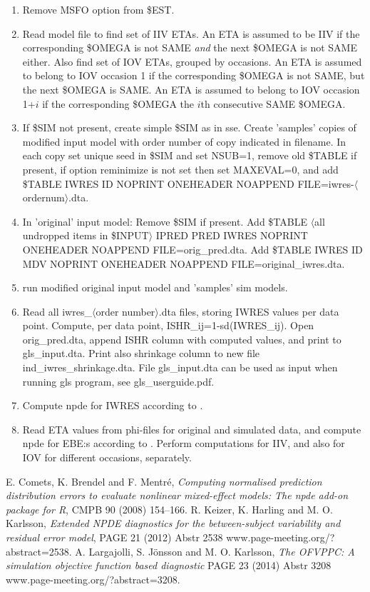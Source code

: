 \begin{enumerate}
\item Remove MSFO option from \$EST.
\item Read model file to find set of IIV ETAs. An ETA is assumed to be IIV if the corresponding \$OMEGA is not SAME
\emph{and} the next \$OMEGA is not SAME either. Also find set of IOV ETAs, grouped by occasions.
An ETA is assumed to belong to IOV occasion 1 if the corresponding \$OMEGA is not SAME, but the next \$OMEGA is SAME. 
An ETA is assumed to belong to IOV occasion 1+$i$ if the corresponding \$OMEGA the $i$th consecutive SAME \$OMEGA. 
\item If \$SIM not present, create simple \$SIM as in sse. Create 'samples' copies of modified input model with order number of copy indicated in filename. In each copy set unique seed in \$SIM and set NSUB=1, remove old \$TABLE if present, 
if option reminimize is not set then set MAXEVAL=0, and add \$TABLE IWRES ID NOPRINT ONEHEADER NOAPPEND FILE=iwres-$\langle$ordernum$\rangle$.dta. 
\item In 'original' input model: Remove \$SIM if present. Add \$TABLE $\langle$all undropped items in \$INPUT$\rangle$ IPRED PRED IWRES NOPRINT ONEHEADER NOAPPEND FILE=orig\_pred.dta. Add \$TABLE IWRES ID MDV NOPRINT ONEHEADER NOAPPEND FILE=original\_iwres.dta. 
\item run modified original input model and 'samples' sim models.
\item Read all iwres\_$\langle$order number$\rangle$.dta files, storing IWRES values per data point. Compute, per data point, ISHR\_ij=1-sd(IWRES\_ij). Open orig\_pred.dta, append ISHR column with computed values, and print to gls\_input.dta. Print also shrinkage column to new file ind\_iwres\_shrinkage.dta. File gls\_input.dta can be used as input when running gls program, see gls\_userguide.pdf. 
\item Compute npde for IWRES according to \cite{Comets}.
\item Read ETA values from 
phi-files for original and simulated data, and compute npde for EBE:s according to \cite{Comets}.
Perform computations for IIV, and also for IOV for different occasions, separately. 
\end{enumerate}

\begin{thebibliography}{99}
 E. Comets, K. Brendel and F. Mentré,
{\em Computing normalised prediction distribution errors to evaluate nonlinear mixed-effect models: The npde add-on package for R},
CMPB 90 (2008) 154–166.
 R. Keizer, K. Harling and M. O. Karlsson,
{\em Extended NPDE diagnostics for the between-subject variability and residual error model},
PAGE 21 (2012) Abstr 2538 \mbox{www.page-meeting.org/?abstract=2538}.
 A. Largajolli, S. Jönsson and M. O. Karlsson,
{\em The OFVPPC: A simulation objective function based diagnostic}
PAGE 23 (2014) Abstr 3208 \mbox{www.page-meeting.org/?abstract=3208}.
\end{thebibliography}     





